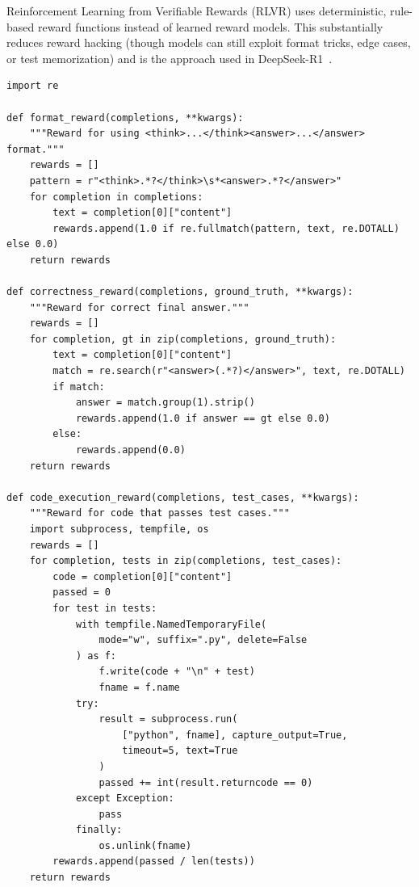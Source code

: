 Reinforcement Learning from Verifiable Rewards (RLVR) uses deterministic, rule-based reward functions instead of learned reward models. This substantially reduces reward hacking (though models can still exploit format tricks, edge cases, or test memorization) and is the approach used in DeepSeek-R1~\cite{deepseek2025r1}.

\begin{examplebox}
\begin{lstlisting}[style=pythonstyle]
import re

def format_reward(completions, **kwargs):
    """Reward for using <think>...</think><answer>...</answer> format."""
    rewards = []
    pattern = r"<think>.*?</think>\s*<answer>.*?</answer>"
    for completion in completions:
        text = completion[0]["content"]
        rewards.append(1.0 if re.fullmatch(pattern, text, re.DOTALL) else 0.0)
    return rewards

def correctness_reward(completions, ground_truth, **kwargs):
    """Reward for correct final answer."""
    rewards = []
    for completion, gt in zip(completions, ground_truth):
        text = completion[0]["content"]
        match = re.search(r"<answer>(.*?)</answer>", text, re.DOTALL)
        if match:
            answer = match.group(1).strip()
            rewards.append(1.0 if answer == gt else 0.0)
        else:
            rewards.append(0.0)
    return rewards

def code_execution_reward(completions, test_cases, **kwargs):
    """Reward for code that passes test cases."""
    import subprocess, tempfile, os
    rewards = []
    for completion, tests in zip(completions, test_cases):
        code = completion[0]["content"]
        passed = 0
        for test in tests:
            with tempfile.NamedTemporaryFile(
                mode="w", suffix=".py", delete=False
            ) as f:
                f.write(code + "\n" + test)
                fname = f.name
            try:
                result = subprocess.run(
                    ["python", fname], capture_output=True,
                    timeout=5, text=True
                )
                passed += int(result.returncode == 0)
            except Exception:
                pass
            finally:
                os.unlink(fname)
        rewards.append(passed / len(tests))
    return rewards
\end{lstlisting}
\end{examplebox}

